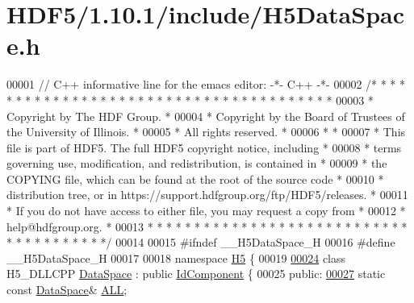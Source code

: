 \hypertarget{_h_d_f5_21_810_81_2include_2_h5_data_space_8h_source}{}\section{H\+D\+F5/1.10.1/include/\+H5\+Data\+Space.h}
\label{_h_d_f5_21_810_81_2include_2_h5_data_space_8h_source}

\begin{DoxyCode}
00001 \textcolor{comment}{// C++ informative line for the emacs editor: -*- C++ -*-}
00002 \textcolor{comment}{/* * * * * * * * * * * * * * * * * * * * * * * * * * * * * * * * * * * * * * *}
00003 \textcolor{comment}{ * Copyright by The HDF Group.                                               *}
00004 \textcolor{comment}{ * Copyright by the Board of Trustees of the University of Illinois.         *}
00005 \textcolor{comment}{ * All rights reserved.                                                      *}
00006 \textcolor{comment}{ *                                                                           *}
00007 \textcolor{comment}{ * This file is part of HDF5.  The full HDF5 copyright notice, including     *}
00008 \textcolor{comment}{ * terms governing use, modification, and redistribution, is contained in    *}
00009 \textcolor{comment}{ * the COPYING file, which can be found at the root of the source code       *}
00010 \textcolor{comment}{ * distribution tree, or in https://support.hdfgroup.org/ftp/HDF5/releases.  *}
00011 \textcolor{comment}{ * If you do not have access to either file, you may request a copy from     *}
00012 \textcolor{comment}{ * help@hdfgroup.org.                                                        *}
00013 \textcolor{comment}{ * * * * * * * * * * * * * * * * * * * * * * * * * * * * * * * * * * * * * * */}
00014 
00015 \textcolor{preprocessor}{#ifndef \_\_H5DataSpace\_H}
00016 \textcolor{preprocessor}{#define \_\_H5DataSpace\_H}
00017 
00018 \textcolor{keyword}{namespace }\hyperlink{namespace_h5}{H5} \{
00019 
\hyperlink{class_h5_1_1_data_space}{00024} \textcolor{keyword}{class }H5\_DLLCPP \hyperlink{class_h5_1_1_data_space}{DataSpace} : \textcolor{keyword}{public} \hyperlink{class_h5_1_1_id_component}{IdComponent} \{
00025    \textcolor{keyword}{public}:
\hyperlink{class_h5_1_1_data_space_ae8a22405edd631eb923a327d39462ff2}{00027}         \textcolor{keyword}{static} \textcolor{keyword}{const} \hyperlink{class_h5_1_1_data_space}{DataSpace}& \hyperlink{class_h5_1_1_data_space_ae8a22405edd631eb923a327d39462ff2}{ALL};

\end{DoxyCode}
